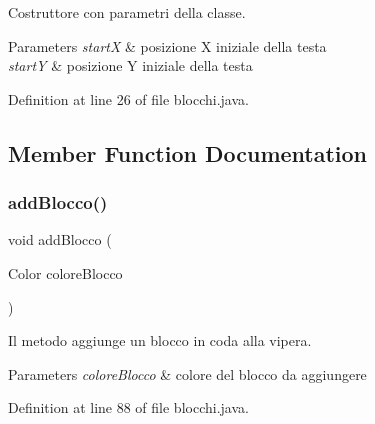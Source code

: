 Costruttore con parametri della classe. 


\begin{DoxyParams}{Parameters}
{\em startX} & posizione X iniziale della testa \\
\hline
{\em startY} & posizione Y iniziale della testa \\
\hline
\end{DoxyParams}


Definition at line 26 of file blocchi.\+java.



\subsection{Member Function Documentation}
\mbox{\label{class_snake_1_1game_1_1vipera_1_1blocchi_aca08d818f8eb2849ca337ea2c64f344d}} 
\subsubsection{\texorpdfstring{add\+Blocco()}{addBlocco()}}
{\footnotesize\ttfamily void add\+Blocco (\begin{DoxyParamCaption}\item[{Color}]{colore\+Blocco }\end{DoxyParamCaption})}



Il metodo aggiunge un blocco in coda alla vipera. 


\begin{DoxyParams}{Parameters}
{\em colore\+Blocco} & colore del blocco da aggiungere \\
\hline
\end{DoxyParams}


Definition at line 88 of file blocchi.\+java.

